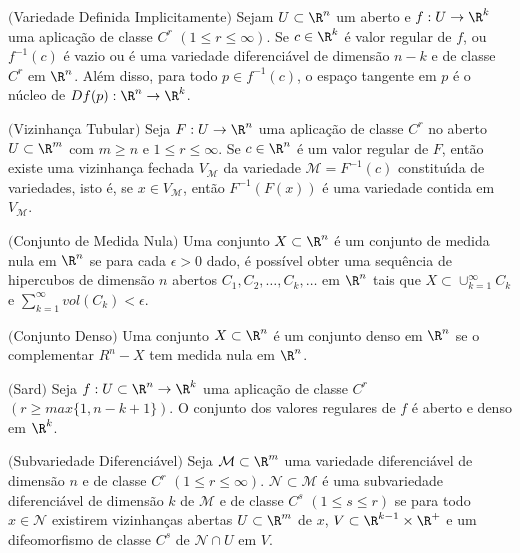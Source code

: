 \begin{teore} $($Variedade Definida Implicitamente$)$ \label{teo_VI}
Sejam $U \subset \R^n$ um aberto e $f : U \rightarrow \R^k$ uma aplicação de classe $C^r$ $(1 \le r \le \infty)$.
Se $c \in \R^k$ é valor regular de $f$, ou $f^{-1}(c)$ é vazio ou é uma variedade diferenciável de dimensão $n-k$ e de classe $C^r$ em $\R^n$.
Além disso, para todo $p \in f^{-1}(c)$, o espaço tangente em $p$ é o núcleo de $Df(p): \R^n \rightarrow \R^k$.
\end{teore} 

\begin{teore} $($Vizinhança Tubular$)$ \label{teo_VT}
Seja $F : U \rightarrow \R^{n}$ uma aplica\c c\~ao de classe $C^{r}$ no 
aberto $U \subset \R^{m}$ com $m \geq n$ e $1 \le r \le \infty$. 
Se $c \in  \R^{n}$ \'e um valor regular de $F$, ent\~ao existe uma vizinhan\c ca fechada $V_{\mathcal{M}}$ da variedade $\mathcal{M} = F^{-1}(c)$ constitu\'{\i}da de variedades, isto \'e, se $x \in V_{\mathcal{M}}$, ent\~ao $F^{-1}(F(x))$ \'e uma variedade contida em $V_{\mathcal{M}}$.
\end{teore} 

\begin{defi} $($Conjunto de Medida Nula$)$
Uma conjunto $X \subset \R^n$ é um conjunto de medida nula em $\R^n$ se para cada $\epsilon > 0$ dado, é possível obter uma sequência de hipercubos de dimensão $n$ abertos $C_1, C_2,\ldots,C_k,\ldots$ em $\R^n$ tais que $X \subset \cup_{k=1}^\infty C_k$ e $\sum_{k=1}^\infty vol(C_k) < \epsilon$.
\end{defi}

\begin{defi} $($Conjunto Denso$)$
Uma conjunto $X \subset \R^n$ é um conjunto denso em $\R^n$ se o complementar $R^n - X$ tem medida nula em $\R^n$.
\end{defi}

\begin{teore} $($Sard$)$ \label{Teo_Sard}
Seja $f : U \subset \R^n \rightarrow \R^k$ uma aplicação de classe $C^r$ $(r \ge max\{1,n-k+1\})$. 
O conjunto dos valores regulares de $f$ é aberto e denso em $\R^k$.
\end{teore}

\begin{defi} $($Subvariedade Diferenciável$)$
Seja $\mathcal{M} \subset \R^m$ uma variedade diferenciável de dimensão $n$ e de classe $C^r$ $(1 \le r \le \infty)$. 
$\mathcal{N} \subset \mathcal{M}$ é uma subvariedade diferenciável de dimensão $k$ de $\mathcal{M}$ e de classe $C^s$ $(1 \le s \le r)$ 
se para todo $x \in \mathcal{N}$ existirem vizinhanças abertas $U \subset \R^m$ de $x$, 
$V \subset \R^{k-1} \times \R^{+}$ e um difeomorfismo de classe $C^s$ de $\mathcal{N} \cap U$ em $V$.  
\end{defi}

